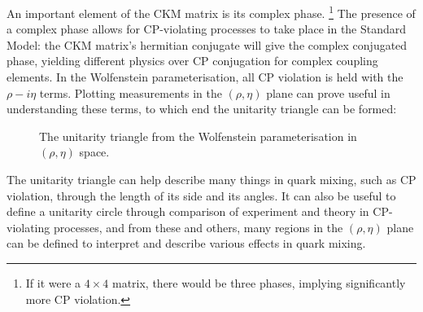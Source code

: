 \documentclass[a4paper,12pt]{article}
\begin{document}
An important element of the CKM matrix is its complex phase.
\hspace{-10pt}\footnote{If it were a $4\times4$ matrix, there would be three phases, implying significantly more CP violation.}
\hspace{-5pt}The presence of a complex phase allows for CP-violating processes to take place in the Standard Model: the CKM matrix's hermitian conjugate will give the complex conjugated phase, yielding different physics over CP conjugation for complex coupling elements. 
In the Wolfenstein parameterisation, all CP violation is held with the $\rho-i\eta$ terms. 
Plotting measurements in the $(\rho,\eta)$ plane can prove useful in understanding these terms, to which end the unitarity triangle can be formed:
\begin{figure}[H]
    \centering
    \caption{\label{fig:unitang} The unitarity triangle from the Wolfenstein parameterisation in $(\rho,\eta)$ space.}
\end{figure}
The unitarity triangle can help describe many things in quark mixing, such as CP violation, through the length of its side and its angles. 
It can also be useful to define a unitarity circle through comparison of experiment and theory in CP-violating processes, and from these and others, many regions in the $(\rho,\eta)$ plane can be defined to interpret and describe various effects in quark mixing. 
\end{document}
